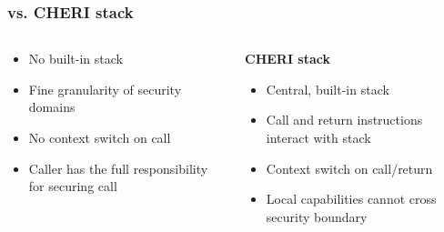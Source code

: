 \documentclass[aspectratio=169]{beamer}
\begin{document}
\begin{frame}
  \frametitle{\stktokens{} vs. CHERI stack}
  \begin{columns}
    \begin{column}{0.5\textwidth}
      \textbf{\stktokens{}}
      \begin{itemize}
      \item No built-in stack
      \item Fine granularity of security domains
      \item No context switch on call
      \item Caller has the full responsibility for securing call
      \end{itemize}
    \end{column}
    \begin{column}{0.5\textwidth}
      \textbf{CHERI stack}
      \begin{itemize}
      \item Central, built-in stack
      \item Call and return instructions interact with stack
      \item Context switch on call/return
      \item Local capabilities cannot cross security boundary
      \end{itemize}
    \end{column}
  \end{columns}
\end{frame}
\end{document}
